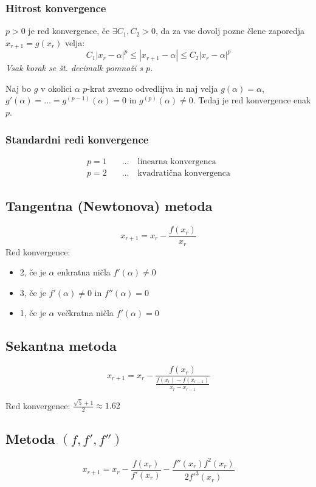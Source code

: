 \begin{multicols}{4}
\subsubsection{Hitrost konvergence}
$p > 0$ je red konvergence, če $\exists C_1, C_2 > 0$, da za vse dovolj pozne člene zaporedja $x_{r+1} = g(x_r)$ velja:
\[ C_1 |x_r - \alpha|^p \leq |x_{r+1} - \alpha| \leq C_2 |x_r - \alpha|^p \]
\textit{Vsak korak se št. decimalk pomnoži s $p$.}

Naj bo $g$ v okolici $\alpha$ $p$-krat zvezno odvedlijva in naj velja 
$g(\alpha) = \alpha$, $g'(\alpha) = \dots = g^{(p-1)}(\alpha) = 0$ in $g^{(p)}(\alpha) \neq 0$.
Tedaj je red konvergence enak $p$.

\subsubsection{Standardni redi konvergence}
\begin{align*}
	p=1 & \quad \dots \quad \text{linearna konvergenca} \\
	p=2 & \quad \dots \quad \text{kvadratična konvergenca}
\end{align*}


\subsection{Tangentna (Newtonova) metoda}
\[ x_{r+1} = x_r - \frac{f(x_r)}{x_r}\]
Red konvergence:
\begin{itemize}
	\item 2, če je $\alpha$ enkratna ničla $f'(\alpha) \neq 0$
	\item 3, če je $f'(\alpha) \neq 0$ in $f''(\alpha) = 0$
	\item 1, če je $\alpha$ večkratna ničla $f'(\alpha) = 0$
\end{itemize}

\subsection{Sekantna metoda}
\[ x_{r+1} = x_r - \frac{f(x_r)}{ \frac{f(x_r)-f(x_{r-1})}{x_r - x_{r-1}} }\]

Red konvergence: $\frac{\sqrt{5}+1}{2} \approx 1.62$

\subsection{Metoda $(f,f',f'')$}
\[ x_{r+1} = x_r - \frac{f(x_r)}{f'(x_r)} - \frac{f''(x_r) f^2(x_r)}{2f'^3(x_r)}\]


\end{multicols}
